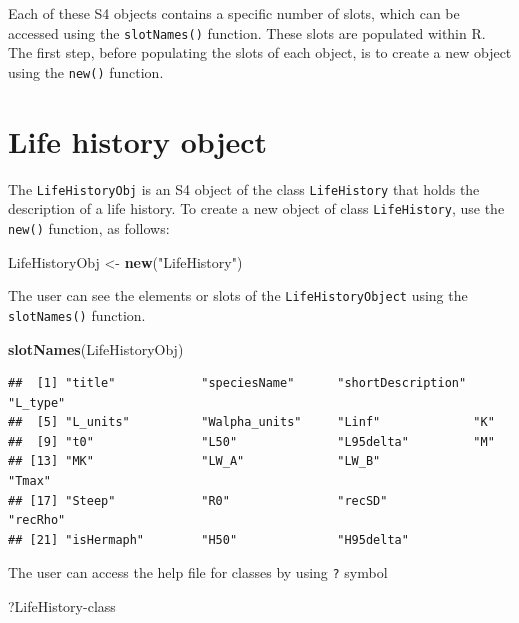 \documentclass[
]{book}
\newenvironment{Shaded}{\begin{snugshade}}{\end{snugshade}}
\newcommand{\AttributeTok}[1]{\textcolor[rgb]{0.13,0.29,0.53}{#1}}
\newcommand{\FunctionTok}[1]{\textcolor[rgb]{0.13,0.29,0.53}{\textbf{#1}}}
\newcommand{\NormalTok}[1]{#1}
\newcommand{\OtherTok}[1]{\textcolor[rgb]{0.56,0.35,0.01}{#1}}
\newcommand{\StringTok}[1]{\textcolor[rgb]{0.31,0.60,0.02}{#1}}
\begin{document}
Each of these S4 objects contains a specific number of slots, which can be accessed using the \texttt{slotNames()} function. These slots are populated within R. The first step, before populating the slots of each object, is to create a new object using the \texttt{new()} function.

\section{Life history object}\label{life-history-object}

The \texttt{LifeHistoryObj} is an S4 object of the class \texttt{LifeHistory} that holds the description of a life history.
To create a new object of class \texttt{LifeHistory}, use the \texttt{new()} function, as follows:

\begin{Shaded}
\begin{Highlighting}[]
\NormalTok{LifeHistoryObj }\OtherTok{\textless{}{-}} \FunctionTok{new}\NormalTok{(}\StringTok{"LifeHistory"}\NormalTok{)}
\end{Highlighting}
\end{Shaded}

The user can see the elements or slots of the \texttt{LifeHistoryObject} using the \texttt{slotNames()} function.

\begin{Shaded}
\begin{Highlighting}[]
\FunctionTok{slotNames}\NormalTok{(LifeHistoryObj)}
\end{Highlighting}
\end{Shaded}

\begin{verbatim}
##  [1] "title"            "speciesName"      "shortDescription" "L_type"          
##  [5] "L_units"          "Walpha_units"     "Linf"             "K"               
##  [9] "t0"               "L50"              "L95delta"         "M"               
## [13] "MK"               "LW_A"             "LW_B"             "Tmax"            
## [17] "Steep"            "R0"               "recSD"            "recRho"          
## [21] "isHermaph"        "H50"              "H95delta"
\end{verbatim}

The user can access the help file for classes by using \texttt{?} symbol

\begin{Shaded}
\begin{Highlighting}[]
\NormalTok{?}\StringTok{\textasciigrave{}}\AttributeTok{LifeHistory{-}class}\StringTok{\textasciigrave{}}  
\end{Highlighting}
\end{Shaded}
\end{document}
